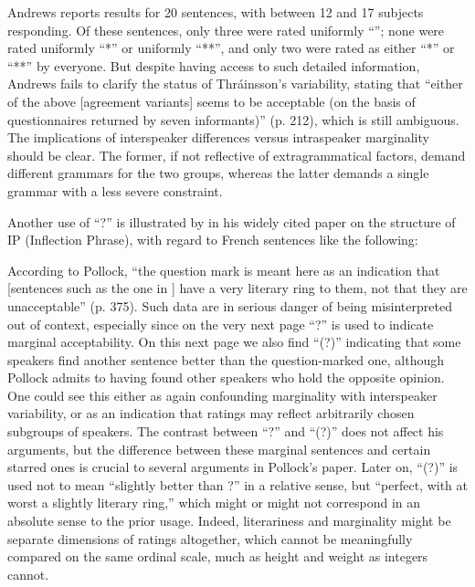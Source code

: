 \noindent
Andrews reports results for 20 sentences, with between 12 and 17 subjects responding. Of these sentences, only three were rated uniformly ``{\checkmark}''; none were rated uniformly ``*'' or uniformly ``**'', and only two were rated as either ``*'' or
``**'' by everyone. But despite having access to such detailed information, Andrews fails to clarify the status of Thráinsson's variability, stating that ``either of the above [agreement variants] seems to be acceptable (on the basis of questionnaires returned by seven informants)'' (p. 212), which is still ambiguous. The implications of interspeaker differences versus intraspeaker marginality should be clear. The former, if not reflective of extragrammatical factors, demand different grammars for the two groups, whereas the latter demands a single grammar with a less severe constraint.

Another use of ``?'' is illustrated by \citet{Pollock1989}
in his widely cited paper on the structure of IP (Inflection Phrase), with regard to French sentences like the following:

\label{ex:2:10}\z

\noindent According to Pollock, ``the question mark is meant here as an indication that [sentences such as the one in ] have a very literary ring to them, not that they are unacceptable'' (p. 375). Such data are in serious danger of being misinterpreted out of context, especially since on the very next page ``?'' is used to indicate marginal acceptability. On this next page we also find ``(?)'' indicating that some speakers find another sentence better than the question-marked one, although Pollock admits to having found other speakers who hold the opposite opinion. One could see this either as again confounding marginality with interspeaker variability, or as an indication that ratings may reflect arbitrarily chosen subgroups of speakers. The contrast between ``?'' and ``(?)'' does not affect his arguments, but the difference between these marginal sentences and certain starred ones is crucial to several arguments in Pollock's paper. Later on, ``(?)'' is used not to mean ``slightly better than ?'' in a relative sense, but ``perfect, with at worst a slightly literary ring,'' which might or might not correspond in an absolute sense to the prior usage. Indeed, literariness and marginality might be separate dimensions of ratings altogether, which cannot be meaningfully compared on the same  ordinal scale, much as height and weight as integers cannot.

